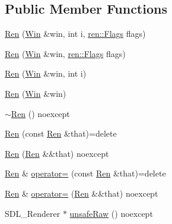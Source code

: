 \subsection*{Public Member Functions}
\begin{DoxyCompactItemize}
\item 
\mbox{\hyperlink{classrolmodl_1_1blend_mode_1_1_ren_a5239bd224f0a250c8c8d58ca26d43394}{Ren}} (\mbox{\hyperlink{classrolmodl_1_1_win}{Win}} \&win, int i, \mbox{\hyperlink{structrolmodl_1_1blend_mode_1_1ren_1_1_flags}{ren\+::\+Flags}} flags)
\item 
\mbox{\hyperlink{classrolmodl_1_1blend_mode_1_1_ren_a26c089075ecf3b7f807167082fa2f6f3}{Ren}} (\mbox{\hyperlink{classrolmodl_1_1_win}{Win}} \&win, \mbox{\hyperlink{structrolmodl_1_1blend_mode_1_1ren_1_1_flags}{ren\+::\+Flags}} flags)
\item 
\mbox{\hyperlink{classrolmodl_1_1blend_mode_1_1_ren_a9ba2bef30d795f156799c60b51d9190b}{Ren}} (\mbox{\hyperlink{classrolmodl_1_1_win}{Win}} \&win, int i)
\item 
\mbox{\hyperlink{classrolmodl_1_1blend_mode_1_1_ren_a2bfdb54f31c8975f77254c1f1dd92961}{Ren}} (\mbox{\hyperlink{classrolmodl_1_1_win}{Win}} \&win)
\item 
\mbox{\hyperlink{classrolmodl_1_1blend_mode_1_1_ren_aa0863971449f4f9ae12437a868ee5faa}{$\sim$\+Ren}} () noexcept
\item 
\mbox{\hyperlink{classrolmodl_1_1blend_mode_1_1_ren_ab595d97a9e85bcc63f2a7d7c702feff5}{Ren}} (const \mbox{\hyperlink{classrolmodl_1_1blend_mode_1_1_ren}{Ren}} \&that)=delete
\item 
\mbox{\hyperlink{classrolmodl_1_1blend_mode_1_1_ren_a31c9148c13f0f44c046d1bfe306bf08d}{Ren}} (\mbox{\hyperlink{classrolmodl_1_1blend_mode_1_1_ren}{Ren}} \&\&that) noexcept
\item 
\mbox{\hyperlink{classrolmodl_1_1blend_mode_1_1_ren}{Ren}} \& \mbox{\hyperlink{classrolmodl_1_1blend_mode_1_1_ren_ad191d9c0c9455a49219193ee9bb11b44}{operator=}} (const \mbox{\hyperlink{classrolmodl_1_1blend_mode_1_1_ren}{Ren}} \&that)=delete
\item 
\mbox{\hyperlink{classrolmodl_1_1blend_mode_1_1_ren}{Ren}} \& \mbox{\hyperlink{classrolmodl_1_1blend_mode_1_1_ren_a9236845edc03f3e22f9d4d9529e4dc6e}{operator=}} (\mbox{\hyperlink{classrolmodl_1_1blend_mode_1_1_ren}{Ren}} \&\&that) noexcept
\item 
S\+D\+L\+\_\+\+Renderer $\ast$ \mbox{\hyperlink{classrolmodl_1_1blend_mode_1_1_ren_afec4c7e137a6d8a4e122773e70d569e2}{unsafe\+Raw}} () noexcept
\item 

\end{DoxyCompactItemize}
